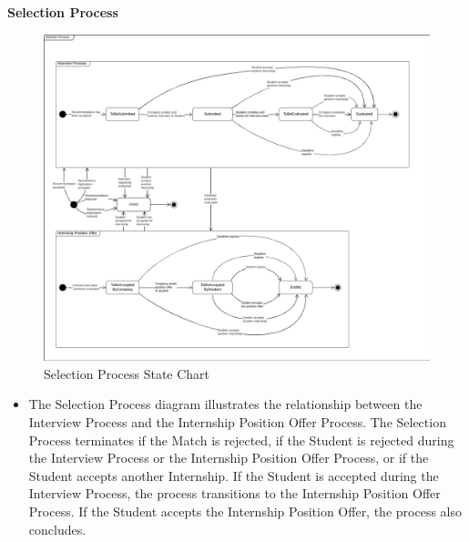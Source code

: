 \noindent\textbf{Selection Process}\\
\begin{figure}[H]
    \centering
    \includegraphics[width=1 \textwidth]{Diagrams/StateCharts/SelectionProcessStateChart.png}
    \caption{Selection Process State Chart}
    \label{fig:SelectionProcess}
\end{figure}
\begin{itemize}
    \item The Selection Process diagram illustrates the relationship between the Interview Process and the Internship Position Offer Process.
    The Selection Process terminates if the Match is rejected, if the Student is rejected during the Interview Process or the Internship Position Offer Process, or if the Student accepts another Internship.
    If the Student is accepted during the Interview Process, the process transitions to the Internship Position Offer Process.
    If the Student accepts the Internship Position Offer, the process also concludes.
\end{itemize}

